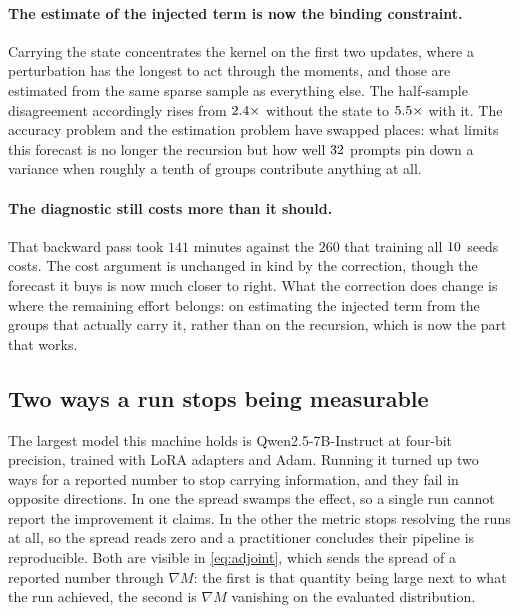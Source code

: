 \paragraph{The estimate of the injected term is now the binding constraint.} Carrying the state
concentrates the kernel on the first two updates, where a perturbation has the longest to act
through the moments, and those are estimated from the same sparse sample as everything else. The
half-sample disagreement accordingly rises from $2.4\times$ without the state to
$5.5\times$ with it. The accuracy problem and the estimation problem have
swapped places: what limits this forecast is no longer the recursion but how well
$32$ prompts pin down a variance when roughly a tenth of groups contribute
anything at all.

\paragraph{The diagnostic still costs more than it should.} That backward pass took $141$ minutes
against the $260$ that training all $10$ seeds costs. The cost argument is
unchanged in kind by the correction, though the forecast it buys is now much closer to right. What
the correction does change is where the remaining effort belongs: on estimating the injected term
from the groups that actually carry it, rather than on the recursion, which is now the part that
works.

\subsection{Two ways a run stops being measurable}
\label{sec:exp-scale}

The largest model this machine holds is Qwen2.5-7B-Instruct at four-bit precision, trained with
LoRA adapters and Adam. Running it turned up two ways for a reported number to stop carrying
information, and they fail in opposite directions. In one the spread swamps the effect, so a single
run cannot report the improvement it claims. In the other the metric stops resolving the runs at
all, so the spread reads zero and a practitioner concludes their pipeline is reproducible. Both are
visible in \eqref{eq:adjoint}, which sends the spread of a reported number through $\nabla M$: the
first is that quantity being large next to what the run achieved, the second is $\nabla M$ vanishing
on the evaluated distribution.

